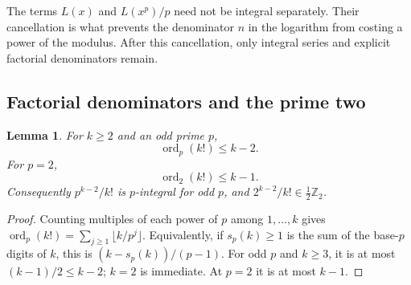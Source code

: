 \documentclass[11pt,letterpaper]{article}
\numberwithin{equation}{section}
\newtheorem{lemma}[lemma]{Lemma}
\theoremstyle{definition}
\theoremstyle{remark}
\newcommand{\Z}{\mathbb Z}
\newcommand{\vp}{\operatorname{ord}_p}
\newcommand{\vtwo}{\operatorname{ord}_2}
\begin{document}
The terms $L(x)$ and $L(x^p)/p$ need not be integral separately.
Their cancellation is what prevents the denominator $n$ in the logarithm
from costing a power of the modulus. After this cancellation, only
integral series and explicit factorial denominators remain.

\subsection{Factorial denominators and the prime two}
\begin{lemma}\label{lem:factorial}
For $k\ge2$ and an odd prime $p$,
\begin{equation}\label{eq:factorial-odd}
 \vp(k!)\le k-2.
\end{equation}
For $p=2$,
\begin{equation}\label{eq:factorial-two}
 \vtwo(k!)\le k-1.
\end{equation}
Consequently $p^{k-2}/k!$ is $p$-integral for odd $p$, and
$2^{k-2}/k!\in\tfrac12\Z_2$.
\end{lemma}
\begin{proof}
Counting multiples of each power of $p$ among $1,\ldots,k$ gives
$\vp(k!)=\sum_{j\ge1}\lfloor k/p^j\rfloor$.
Equivalently, if $s_p(k)\ge1$ is the sum of the base-$p$ digits of $k$,
this is $(k-s_p(k))/(p-1)$. For odd $p$ and $k\ge3$, it is at most
$(k-1)/2\le k-2$; $k=2$ is immediate. At $p=2$ it is at most $k-1$.
\end{proof}
\end{document}

